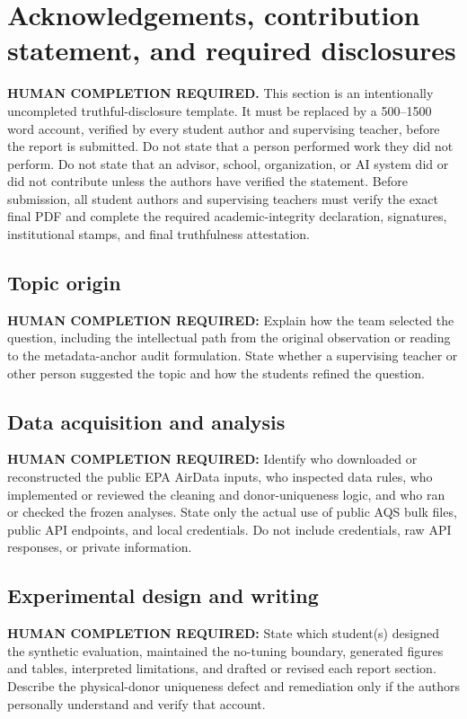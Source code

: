 \section{Acknowledgements, contribution statement, and required disclosures}
\suppressfloats[t]

\textbf{HUMAN COMPLETION REQUIRED.} This section is an intentionally
uncompleted truthful-disclosure template. It must be replaced by a 500--1500
word account, verified by every student author and supervising teacher, before
the report is submitted. Do not state that a person performed work they did not
perform. Do not state that an advisor, school, organization, or AI system did
or did not contribute unless the authors have verified the statement.
Before submission, all student authors and supervising teachers must verify the
exact final PDF and complete the required academic-integrity declaration,
signatures, institutional stamps, and final truthfulness attestation.

\subsection*{Topic origin}
\textbf{HUMAN COMPLETION REQUIRED:} Explain how the team selected the question,
including the intellectual path from the original observation or reading to the
metadata-anchor audit formulation. State whether a supervising teacher or other
person suggested the topic and how the students refined the question.

\subsection*{Data acquisition and analysis}
\textbf{HUMAN COMPLETION REQUIRED:} Identify who downloaded or reconstructed
the public EPA AirData inputs, who inspected data rules, who implemented or
reviewed the cleaning and donor-uniqueness logic, and who ran or checked the
frozen analyses. State only the actual use of public AQS bulk files, public API
endpoints, and local credentials. Do not include credentials, raw API
responses, or private information.

\subsection*{Experimental design and writing}
\textbf{HUMAN COMPLETION REQUIRED:} State which student(s) designed the
synthetic evaluation, maintained the no-tuning boundary, generated figures and
tables, interpreted limitations, and drafted or revised each report section.
Describe the physical-donor uniqueness defect and remediation only if the
authors personally understand and verify that account.

